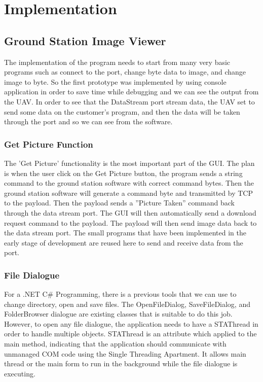 \chapter{Implementation}






\section{Ground Station Image Viewer}
The implementation of the program needs to start from many very basic programs such as connect to the port, change byte data to image, and change image to byte. 
So the first prototype was implemented by using console application in order to save time while debugging and we can see the output from the UAV. In order to see that the DataStream port stream data, the UAV set to send some data on the customer’s program, and then the data will be taken through the port and so we can see from the software.  

\subsection{Get Picture Function}
The 'Get Picture' functionality is the most important part of the GUI. The plan is when the user click on the Get Picture button, the program sends a string command to the ground station software with correct command bytes. Then the ground station software will generate a command byte and transmitted by TCP to the payload. Then the payload sends a ''Picture Taken'' command back through the data stream port. The GUI will then automatically send a download request command to the payload. The payload will then send image data back to the data stream port. The small programs that have been implemented in the early stage of development are reused here to send and receive data from the port. 

\subsection{File Dialogue}
For a .NET C\# Programming, there is a previous tools that we can use to change directory, open and save files. The OpenFileDialog,  SaveFileDialog, and FolderBrowser dialogue are existing classes that is suitable to do this job. However, to open any file dialogue, the application needs to have a STAThread in order to handle multiple objects. STAThread is an attribute which applied to the main method, indicating that the application should communicate with unmanaged COM code using the Single Threading Apartment. It allows main thread or the main form to run in the background while the file dialogue is executing. 

